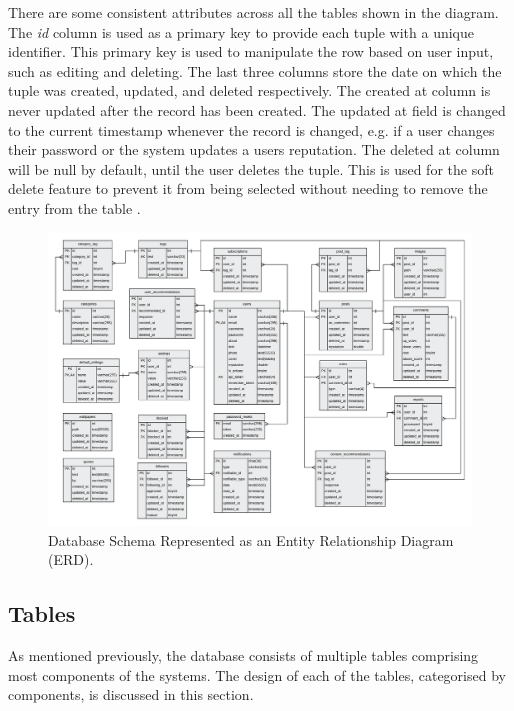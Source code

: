 There are some consistent attributes across all the tables shown in the diagram. The \textsl{id} column is used as a primary key to provide each tuple with a unique identifier. This primary key is used to manipulate the row based on user input, such as editing and deleting. The last three columns store the date on which the tuple was created, updated, and deleted respectively. The created at column is never updated after the record has been created. The updated at field is changed to the current timestamp whenever the record is changed, e.g. if a user changes their password or the system updates a users reputation. The deleted at column will be null by default, until the user deletes the tuple. This is used for the soft delete feature to prevent it from being selected without needing to remove the entry from the table \cite{PCMEncyclopedia:SoftDelete}.

\begin{figure}[H]
  \centering
  \includegraphics[width=1.0\textwidth]{Images/Design/Database/ERD}
  \caption{Database Schema Represented as an Entity Relationship Diagram (ERD).} \label{fig:Database_ERD}
\end{figure}

\subsection{Tables}
\label{SubSection:Database_Tables}
As mentioned previously, the database consists of multiple tables comprising most components of the systems. The design of each of the tables, categorised by components, is discussed in this section.

